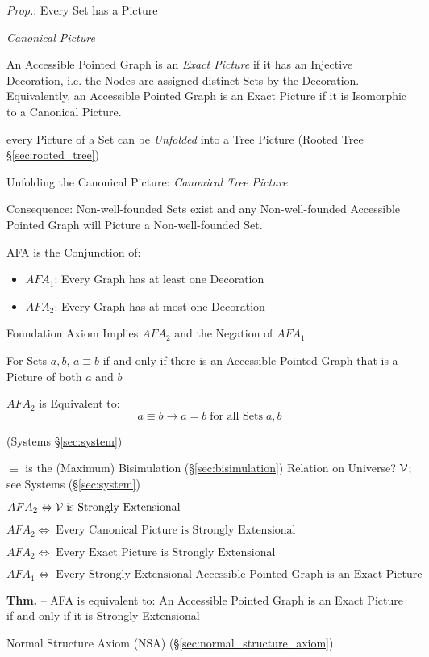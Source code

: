 \emph{Prop.}: Every Set has a Picture

\emph{Canonical Picture}

An Accessible Pointed Graph is an \emph{Exact Picture} if it has an
Injective Decoration, i.e. the Nodes are assigned distinct Sets by the
Decoration. Equivalently, an Accessible Pointed Graph is an Exact
Picture if it is Isomorphic to a Canonical Picture.

every Picture of a Set can be \emph{Unfolded} into a Tree Picture
(Rooted Tree \S\ref{sec:rooted_tree})

Unfolding the Canonical Picture: \emph{Canonical Tree Picture}

Consequence: Non-well-founded Sets exist and any Non-well-founded
Accessible Pointed Graph will Picture a Non-well-founded Set.

AFA is the Conjunction of:
\begin{itemize}
  \item $AFA_1$: Every Graph has at least one Decoration
  \item $AFA_2$: Every Graph has at most one Decoration
\end{itemize}

Foundation Axiom Implies $AFA_2$ and the Negation of $AFA_1$

For Sets $a,b$, $a \equiv b$ if and only if there is an Accessible
Pointed Graph that is a Picture of both $a$ and $b$

$AFA_2$ is Equivalent to:
\[
  a \equiv b \to a = b \;\text{for all Sets}\; a,b
\]

(Systems \S\ref{sec:system})

$\equiv$ is the (Maximum) Bisimulation (\S\ref{sec:bisimulation}) Relation on
Universe? $\mathcal{V}$; see Systems (\S\ref{sec:system})

$AFA_2 \Leftrightarrow \mathcal{V} \;\text{is Strongly Extensional}$

$AFA_2 \Leftrightarrow \;\text{Every Canonical Picture is Strongly
  Extensional}$

$AFA_2 \Leftrightarrow \;\text{Every Exact Picture is Strongly
  Extensional}$

$AFA_1 \Leftrightarrow \;\text{Every Strongly Extensional Accessible
  Pointed Graph is an Exact Picture}$

\textbf{Thm.} -- AFA is equivalent to: An Accessible Pointed Graph is
an Exact Picture if and only if it is Strongly Extensional

Normal Structure Axiom (NSA) (\S\ref{sec:normal_structure_axiom})

